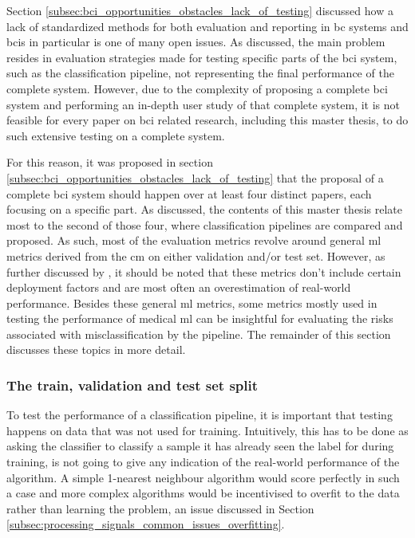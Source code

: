 Section \ref{subsec:bci_opportunities_obstacles_lack_of_testing} discussed how a lack of standardized methods for both evaluation and reporting in \gls{bc} systems and \glspl{bci} in particular is one of many open issues.
As discussed, the main problem resides in evaluation strategies made for testing specific parts of the \gls{bci} system, such as the classification pipeline, not representing the final performance of the complete system.
However, due to the complexity of proposing a complete \gls{bci} system and performing an in-depth user study of that complete system, it is not feasible for every paper on \gls{bci} related research, including this master thesis, to do such extensive testing on a complete system.

For this reason, it was proposed in section \ref{subsec:bci_opportunities_obstacles_lack_of_testing} that the proposal of a complete \gls{bci} system should happen over at least four distinct papers, each focusing on a specific part.
As discussed, the contents of this master thesis relate most to the second of those four, where classification pipelines are compared and proposed.
As such, most of the evaluation metrics revolve around general \gls{ml} metrics derived from the \gls{cm} on either validation and/or test set.
However, as further discussed by \citet{ml_underspec}, it should be noted that these metrics don't include certain deployment factors and are most often an overestimation of real-world performance.
Besides these general \gls{ml} metrics, some metrics mostly used in testing the performance of medical \gls{ml} can be insightful for evaluating the risks associated with misclassification by the pipeline.
The remainder of this section discusses these topics in more detail.


\subsubsection{The train, validation and test set split}
\label{subsubsec:processing_signals_evaluating_and_using_evaluation_valtest}

To test the performance of a classification pipeline, it is important that testing happens on data that was not used for training.
Intuitively, this has to be done as asking the classifier to classify a sample it has already seen the label for during training, is not going to give any indication of the real-world performance of the algorithm.
A simple 1-nearest neighbour algorithm would score perfectly in such a case and more complex algorithms would be incentivised to overfit to the data rather than learning the problem, an issue discussed in Section \ref{subsec:processing_signals_common_issues_overfitting}.

